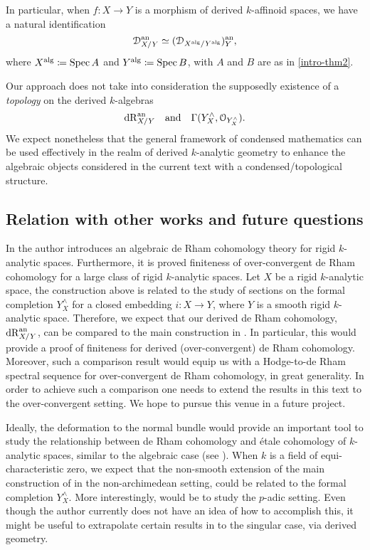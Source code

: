 \documentclass[10pt,a4paper,reqno]{amsart} %
\theoremstyle{plain}
\theoremstyle{definition}
\theoremstyle{remark}
\numberwithin{equation}{section}
\begin{document}
In particular, when $f \colon X \to Y$ is a morphism of derived $k$-affinoid spaces, we have a natural identification
    \[
        \mathcal D_{X/ Y}^\mathrm{an} \simeq (\mathcal D_{X^\mathrm{alg}/ Y^\mathrm{alg}} )^\mathrm{an}_Y,  
    \]
where $X^\mathrm{alg} \coloneqq \operatorname{Spec} A$ and $Y^\mathrm{alg} \coloneqq \operatorname{Spec} B$, with $A$ and $B$ are as in \cref{intro-thm2}. 

Our approach does not take into consideration the supposedly existence of a \emph{topology} on the derived $k$-algebras
    \[
        \mathrm{dR}_{X/Y}^\mathrm{an} \quad \mathrm{and} \quad \Gamma(Y^\wedge_X, \mathcal O_{Y^\wedge_X}).  
    \]
We expect nonetheless that the general framework of condensed mathematics can be used effectively in the realm of derived $k$-analytic geometry
to enhance the algebraic objects considered in the current text with a condensed/topological structure.


\subsection{Relation with other works and future questions} In \cite{grosse2002finiteness} the author introduces an algebraic de Rham cohomology
theory for rigid $k$-analytic spaces. Furthermore, it is proved finiteness of over-convergent de Rham cohomology for a large class of rigid $k$-analytic spaces.
Let $X$ be a rigid $k$-analytic space, the construction above is related to the study of sections on the formal completion $Y^\wedge_X$ for a
closed embedding $i \colon X \to Y$, where $Y$ is a smooth rigid $k$-analytic space.
Therefore, we expect that our derived de Rham cohomology, $\mathrm{dR}_{X/ Y}^\mathrm{an}$, can be compared to the main construction in \cite{grosse2002finiteness}. In particular,
this would provide a proof of finiteness for derived (over-convergent) de Rham cohomology.
Moreover, such a comparison result would equip us with a Hodge-to-de Rham
spectral sequence for over-convergent de Rham cohomology, in great generality. 
In order to achieve such a comparison one needs to extend
the results in this text to the over-convergent setting. We hope to pursue this venue in a future project.


Ideally, the deformation to the normal bundle would provide an important tool to study the relationship between de Rham cohomology and \'etale cohomology
of $k$-analytic spaces, similar to the algebraic case (see \cite{Bhatt_Derived_Completions}). When $k$ is a field of equi-characteristic zero, we expect that the non-smooth extension of the main construction of \cite{achinger2019betti} in the non-archimedean setting, could be related to the formal
completion $Y^\wedge_X$. More interestingly, would be to study the $p$-adic setting. Even though the author currently does not have an idea of how to accomplish
this, it might be useful to extrapolate certain results in \cite{bras2018overconvergent} to the singular case, via derived geometry.
\end{document}

